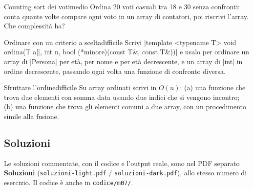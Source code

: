 \begin{esercizio}{Counting sort dei voti}{medio}
Ordina 20 voti casuali tra 18 e 30 senza confronti: conta quante volte compare ogni
voto in un array di contatori, poi riscrivi l'array. Che complessità ha?
\end{esercizio}

\begin{esercizio}{Ordinare con un criterio a scelta}{difficile}
Scrivi \cc|template <typename T> void ordina(T a[], int n, bool (*minore)(const T&, const T&))|
e usalo per ordinare un array di \cc|Persona| per età, per nome e per età
decrescente, e un array di \cc|int| in ordine decrescente, passando ogni volta una
funzione di confronto diversa.
\end{esercizio}

\begin{esercizio}{Sfruttare l'ordine}{difficile}
Su array ordinati scrivi in $O(n)$: (a) una funzione che trova due elementi con somma
data usando due indici che si vengono incontro; (b) una funzione che trova gli elementi
comuni a due array, con un procedimento simile alla fusione.
\end{esercizio}

\subsection*{Soluzioni}
Le soluzioni commentate, con il codice e l'output reale, sono nel PDF separato
\textbf{Soluzioni} (\texttt{soluzioni-light.pdf} / \texttt{soluzioni-dark.pdf}),
allo stesso numero di esercizio. Il codice è anche in \texttt{codice/m07/}.
